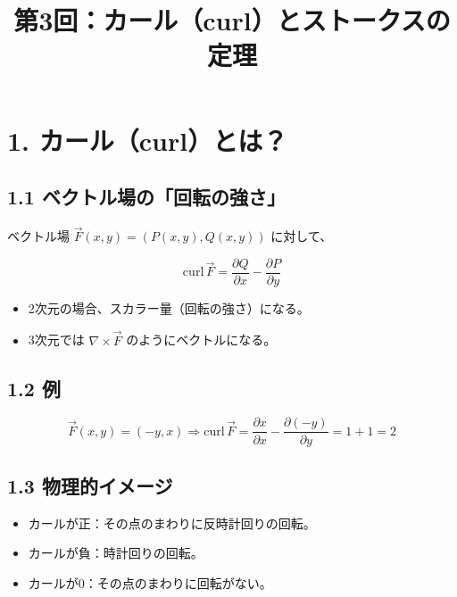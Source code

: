 \documentclass[a4j,11pt]{jsarticle}
\title{第3回：カール（curl）とストークスの定理}
\author{}
\date{}
\begin{document}
\maketitle

\section*{1. カール（curl）とは？}

\subsection*{1.1 ベクトル場の「回転の強さ」}
ベクトル場 $\vec{F}(x, y) = (P(x, y), Q(x, y))$ に対して、

\[
\mathrm{curl} \, \vec{F} = \frac{\partial Q}{\partial x} - \frac{\partial P}{\partial y}
\]

\begin{itemize}
  \item 2次元の場合、スカラー量（回転の強さ）になる。
  \item 3次元では $\nabla \times \vec{F}$ のようにベクトルになる。
\end{itemize}

\subsection*{1.2 例}
\[
\vec{F}(x, y) = (-y, x) \Rightarrow \mathrm{curl} \, \vec{F} = \frac{\partial x}{\partial x} - \frac{\partial (-y)}{\partial y} = 1 + 1 = 2
\]

\begin{center}
\end{center}

\subsection*{1.3 物理的イメージ}
\begin{itemize}
  \item カールが正：その点のまわりに反時計回りの回転。
  \item カールが負：時計回りの回転。
  \item カールが0：その点のまわりに回転がない。
\end{itemize}
\end{document}
